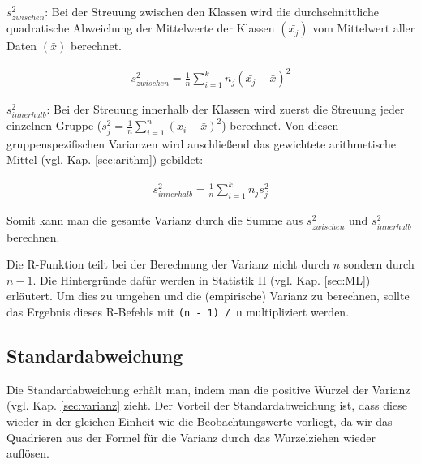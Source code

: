 \documentclass[a4paper]{article}
\newcommand\dangersign[1][2ex]{%
  \renewcommand\stacktype{L}%
  \scaleto{\stackon[1.3pt]{\color{red}$\triangle$}{\tiny !}}{#1}%
}
\begin{document}
\noindent $s^2_{zwischen}$: Bei der Streuung zwischen den Klassen wird die durchschnittliche quadratische Abweichung der Mittelwerte der Klassen $(\bar{x_j})$ vom Mittelwert aller Daten $(\bar{x})$ berechnet.

\begin{align*}
    s^2_{zwischen} = \frac{1}{n} \sum_{i=1}^k n_j (\bar{x_j}-\bar{x})^2
\end{align*}

\noindent $s^2_{innerhalb}$: Bei der Streuung innerhalb der Klassen wird zuerst die Streuung jeder einzelnen Gruppe ($s^2_j=\frac{1}{n} \sum_{i=1}^n (x_i-\bar{x})^2$) berechnet. Von diesen gruppenspezifischen Varianzen wird anschließend das gewichtete arithmetische Mittel (vgl. Kap. \ref{sec:arithm}) gebildet:

\begin{align*}
    s^2_{innerhalb} = \frac{1}{n} \sum_{i=1}^k n_j s^2_j
\end{align*}

\noindent Somit kann man die gesamte Varianz durch die Summe aus $s^2_{zwischen}$ und $s^2_{innerhalb}$ berechnen.\\

\noindent {}

\noindent \dangersign[3ex] Die R-Funktion teilt bei der Berechnung der Varianz nicht durch $n$ sondern durch $n-1$. Die Hintergründe dafür werden in Statistik II (vgl. Kap. \ref{sec:ML}) erläutert. Um dies zu umgehen und die (empirische) Varianz zu berechnen, sollte das Ergebnis dieses R-Befehls mit \texttt{(n - 1) / n} multipliziert werden.

\subsection{Standardabweichung}
Die Standardabweichung erhält man, indem man die positive Wurzel der Varianz (vgl. Kap. \ref{sec:varianz} zieht. Der Vorteil der Standardabweichung ist, dass diese wieder in der gleichen Einheit wie die Beobachtungswerte vorliegt, da wir das Quadrieren aus der Formel für die Varianz durch das Wurzelziehen wieder auflösen.\\

\noindent {}
\end{document}

